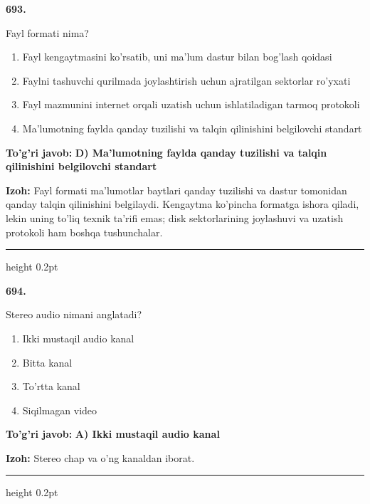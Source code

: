\documentclass[10pt,a4paper,oneside]{article}
\begin{document}
\noindent\textbf{\color{ink}693.}
\par
Fayl formati nima?
\begin{enumerate}[label=\Alph*),leftmargin=9mm]
\item Fayl kengaytmasini ko'rsatib, uni ma'lum dastur bilan bog'lash qoidasi
\item Faylni tashuvchi qurilmada joylashtirish uchun ajratilgan sektorlar ro'yxati
\item Fayl mazmunini internet orqali uzatish uchun ishlatiladigan tarmoq protokoli
\item Ma'lumotning faylda qanday tuzilishi va talqin qilinishini belgilovchi standart
\end{enumerate}
\begin{tcolorbox}[enhanced,breakable,colback=teal!4,colframe=teal!50!black,boxrule=0.5pt,arc=1.1mm,left=3mm,right=3mm,top=1.7mm,bottom=1.7mm,before skip=2mm,after skip=2mm]
\textbf{\color{teal}To'g'ri javob:} \textbf{D) Ma'lumotning faylda qanday tuzilishi va talqin qilinishini belgilovchi standart}
\par\smallskip
\textbf{Izoh:} Fayl formati ma'lumotlar baytlari qanday tuzilishi va dastur tomonidan qanday talqin qilinishini belgilaydi. Kengaytma ko'pincha formatga ishora qiladi, lekin uning to'liq texnik ta'rifi emas; disk sektorlarining joylashuvi va uzatish protokoli ham boshqa tushunchalar.
\end{tcolorbox}
\vspace{2mm}\hrule height 0.2pt \vspace{3mm}

\noindent\textbf{\color{ink}694.}
\par
Stereo audio nimani anglatadi?
\begin{enumerate}[label=\Alph*),leftmargin=9mm]
\item Ikki mustaqil audio kanal
\item Bitta kanal
\item To'rtta kanal
\item Siqilmagan video
\end{enumerate}
\begin{tcolorbox}[enhanced,breakable,colback=teal!4,colframe=teal!50!black,boxrule=0.5pt,arc=1.1mm,left=3mm,right=3mm,top=1.7mm,bottom=1.7mm,before skip=2mm,after skip=2mm]
\textbf{\color{teal}To'g'ri javob:} \textbf{A) Ikki mustaqil audio kanal}
\par\smallskip
\textbf{Izoh:} Stereo chap va o'ng kanaldan iborat.
\end{tcolorbox}
\vspace{2mm}\hrule height 0.2pt \vspace{3mm}
\end{document}
